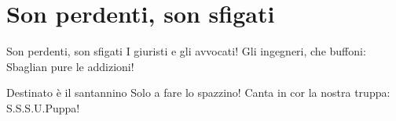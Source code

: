 \section{Son perdenti, son sfigati}
\subtitle{Sul canto tipico dei marines}

\subtitle{Ogni verso si canta due volte}
\begin{canzone}
Son perdenti, son sfigati
I giuristi e gli avvocati!
Gli ingegneri, che buffoni:
Sbaglian pure le addizioni!

Destinato è il santannino
Solo a fare lo spazzino!
Canta in cor la nostra truppa:
S.S.S.U.Puppa!
\end{canzone}
